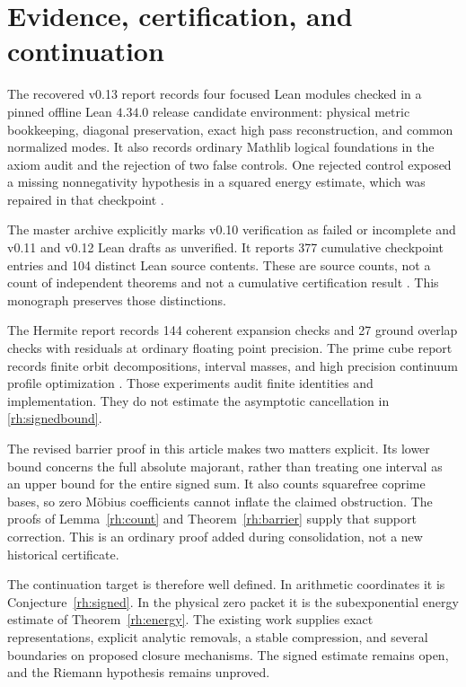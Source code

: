 \section{Evidence, certification, and continuation}

The recovered v0.13 report records four focused Lean modules checked in a pinned offline Lean \(4.34.0\) release candidate environment: physical metric bookkeeping, diagonal preservation, exact high pass reconstruction, and common normalized modes. It also records ordinary Mathlib logical foundations in the axiom audit and the rejection of two false controls. One rejected control exposed a missing nonnegativity hypothesis in a squared energy estimate, which was repaired in that checkpoint \cite{KomorebiFinalGap}.

The master archive explicitly marks v0.10 verification as failed or incomplete and v0.11 and v0.12 Lean drafts as unverified. It reports 377 cumulative checkpoint entries and 104 distinct Lean source contents. These are source counts, not a count of independent theorems and not a cumulative certification result \cite{KomorebiMaster}. This monograph preserves those distinctions.

The Hermite report records 144 coherent expansion checks and 27 ground overlap checks with residuals at ordinary floating point precision. The prime cube report records finite orbit decompositions, interval masses, and high precision continuum profile optimization \cite{KomorebiHermite,KomorebiParity}. Those experiments audit finite identities and implementation. They do not estimate the asymptotic cancellation in \eqref{rh:signedbound}.

The revised barrier proof in this article makes two matters explicit. Its lower bound concerns the full absolute majorant, rather than treating one interval as an upper bound for the entire signed sum. It also counts squarefree coprime bases, so zero Möbius coefficients cannot inflate the claimed obstruction. The proofs of Lemma~\ref{rh:count} and Theorem~\ref{rh:barrier} supply that support correction. This is an ordinary proof added during consolidation, not a new historical certificate.

The continuation target is therefore well defined. In arithmetic coordinates it is Conjecture~\ref{rh:signed}. In the physical zero packet it is the subexponential energy estimate of Theorem~\ref{rh:energy}. The existing work supplies exact representations, explicit analytic removals, a stable compression, and several boundaries on proposed closure mechanisms. The signed estimate remains open, and the Riemann hypothesis remains unproved.
